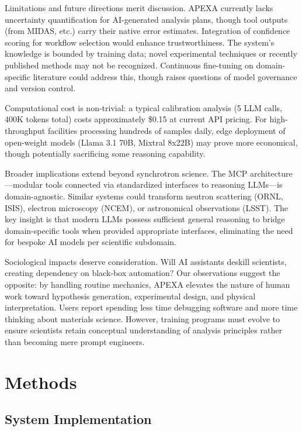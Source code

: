 \documentclass[11pt]{article}
\begin{document}
Limitations and future directions merit discussion. APEXA currently lacks uncertainty quantification for AI-generated analysis plans, though tool outputs (from MIDAS, etc.) carry their native error estimates. Integration of confidence scoring for workflow selection would enhance trustworthiness. The system's knowledge is bounded by training data; novel experimental techniques or recently published methods may not be recognized. Continuous fine-tuning on domain-specific literature could address this, though raises questions of model governance and version control.

Computational cost is non-trivial: a typical calibration analysis (5 LLM calls, 400K tokens total) costs approximately \$0.15 at current API pricing. For high-throughput facilities processing hundreds of samples daily, edge deployment of open-weight models (Llama 3.1 70B, Mixtral 8x22B) may prove more economical, though potentially sacrificing some reasoning capability.

Broader implications extend beyond synchrotron science. The MCP architecture—modular tools connected via standardized interfaces to reasoning LLMs—is domain-agnostic. Similar systems could transform neutron scattering (ORNL, ISIS), electron microscopy (NCEM), or astronomical observations (LSST). The key insight is that modern LLMs possess sufficient general reasoning to bridge domain-specific tools when provided appropriate interfaces, eliminating the need for bespoke AI models per scientific subdomain.

Sociological impacts deserve consideration. Will AI assistants deskill scientists, creating dependency on black-box automation? Our observations suggest the opposite: by handling routine mechanics, APEXA elevates the nature of human work toward hypothesis generation, experimental design, and physical interpretation. Users report spending less time debugging software and more time thinking about materials science. However, training programs must evolve to ensure scientists retain conceptual understanding of analysis principles rather than becoming mere prompt engineers.

\section{Methods}

\subsection{System Implementation}
\end{document}
